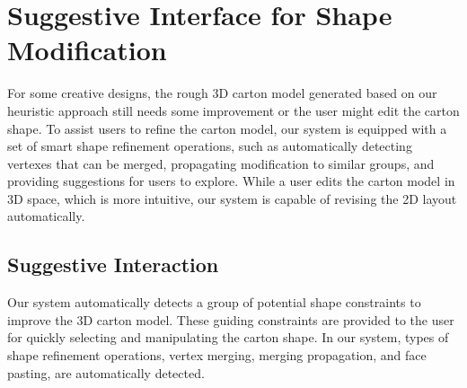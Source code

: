 \section{Suggestive Interface for Shape Modification }\label{sec:interaction}
%
For some creative designs, the rough 3D carton model generated based on our heuristic approach still needs some improvement or the user might edit the carton shape. 
To assist users to refine the carton model, our system is equipped with a set of smart shape refinement operations, such as automatically detecting vertexes that can be merged, propagating modification to similar groups, and providing suggestions for users to explore. 
%
While a user edits the carton model in 3D space, which is more intuitive, our system is capable of revising the 2D layout automatically. 



\subsection{Suggestive Interaction}

Our system automatically detects a group of potential shape constraints to improve the 3D carton model.
%
These guiding constraints are provided to the user for quickly selecting and manipulating the carton shape.
In our system,  types of shape refinement operations, vertex merging, merging propagation, and face pasting, are automatically detected.

%

